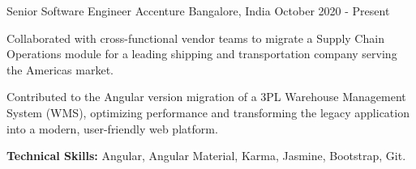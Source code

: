 

\begin{cventries}


\cventry
    {Senior Software Engineer} %
    {Accenture} %
    {Bangalore, India} %
    {October 2020 - Present} %
    {
      \begin{cvitems} %
        \item {Collaborated with cross-functional vendor teams to migrate a Supply Chain Operations module for a leading shipping and transportation company serving the Americas market.}
        \item {Contributed to the Angular version migration of a 3PL Warehouse Management System (WMS), optimizing performance and transforming the legacy application into a modern, user-friendly web platform.}
        \item {\textbf{Technical Skills:} Angular, Angular Material, Karma, Jasmine, Bootstrap, Git.}
      \end{cvitems}
    }
    
 

\end{cventries}
